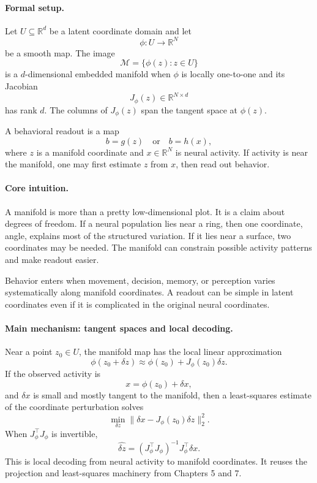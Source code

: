 \paragraph{Formal setup.}
Let \(U\subseteq\mathbb R^d\) be a latent coordinate domain and let
\[
\phi:U\to\mathbb R^N
\]
be a smooth map. The image
\[
\mathcal M=\{\phi(z):z\in U\}
\]
is a \(d\)-dimensional embedded manifold when \(\phi\) is locally one-to-one and its Jacobian
\[
J_\phi(z)\in\mathbb R^{N\times d}
\]
has rank \(d\). The columns of \(J_\phi(z)\) span the tangent space at \(\phi(z)\).

A behavioral readout is a map
\[
b=g(z)
\quad\text{or}\quad
b=h(x),
\]
where \(z\) is a manifold coordinate and \(x\in\mathbb R^N\) is neural activity. If activity is near the manifold, one may first estimate \(z\) from \(x\), then read out behavior.

\paragraph{Core intuition.}
A manifold is more than a pretty low-dimensional plot. It is a claim about degrees of freedom. If a neural population lies near a ring, then one coordinate, angle, explains most of the structured variation. If it lies near a surface, two coordinates may be needed. The manifold can constrain possible activity patterns and make readout easier.

Behavior enters when movement, decision, memory, or perception varies systematically along manifold coordinates. A readout can be simple in latent coordinates even if it is complicated in the original neural coordinates.

\paragraph{Main mechanism: tangent spaces and local decoding.}
Near a point \(z_0\in U\), the manifold map has the local linear approximation
\[
\phi(z_0+\delta z)\approx \phi(z_0)+J_\phi(z_0)\delta z.
\]
If the observed activity is
\[
x=\phi(z_0)+\delta x,
\]
and \(\delta x\) is small and mostly tangent to the manifold, then a least-squares estimate of the coordinate perturbation solves
\[
\min_{\delta z}\|\delta x-J_\phi(z_0)\delta z\|_2^2.
\]
When \(J_\phi^\top J_\phi\) is invertible,
\[
\boxed{
\widehat{\delta z}
=(J_\phi^\top J_\phi)^{-1}J_\phi^\top\delta x.
}
\]
This is local decoding from neural activity to manifold coordinates. It reuses the projection and least-squares machinery from Chapters 5 and 7.

